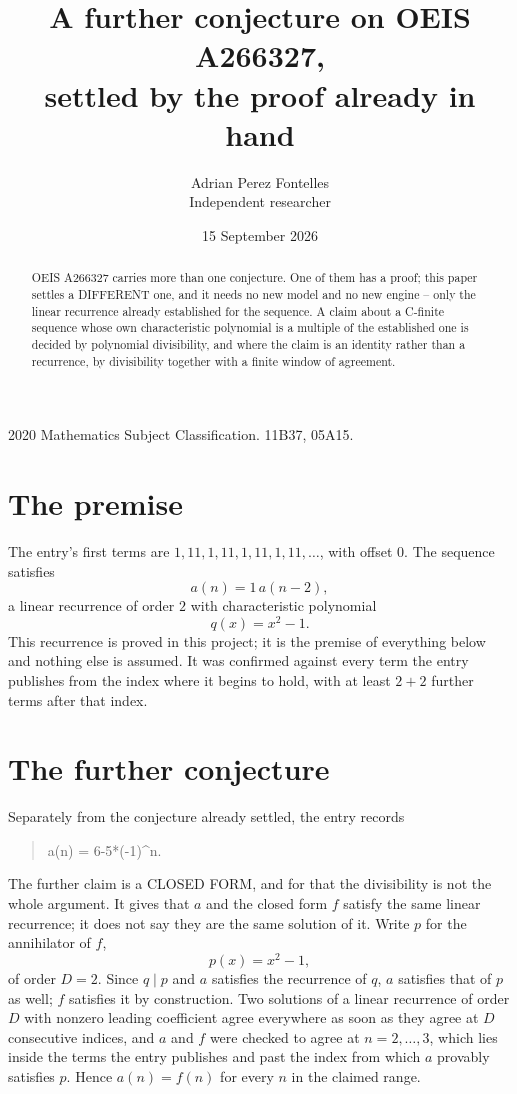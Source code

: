 \documentclass[11pt,a4paper]{article}
\title{A further conjecture on OEIS A266327,\\ \large settled by the proof already in hand}
\author{Adrian Perez Fontelles\\ \small Independent researcher}
\date{15 September 2026}
\theoremstyle{plain}
\theoremstyle{definition}
\begin{document}
\maketitle

\begin{abstract}
OEIS A266327 carries more than one conjecture. One of them has a proof; this paper settles a
DIFFERENT one, and it needs no new model and no new engine -- only the linear recurrence already
established for the sequence. A claim about a C-finite sequence whose own characteristic
polynomial is a multiple of the established one is decided by polynomial divisibility, and where
the claim is an identity rather than a recurrence, by divisibility together with a finite window
of agreement.
\end{abstract}

\noindent\small 2020 Mathematics Subject Classification. 11B37, 05A15.\normalsize

\section{The premise}

The entry's first terms are $1, 11, 1, 11, 1, 11, 1, 11,\dots$, with offset $0$. The sequence satisfies
\[
  a(n)=1\,a(n-2) ,
\]
a linear recurrence of order $2$ with characteristic polynomial
\[
  q(x)=x^{2} - 1 .
\]
This recurrence is proved in this project; it is the premise of everything below and nothing else is assumed.
It was confirmed against every term the entry publishes from the index where it begins to hold,
with at least $2+2$ further terms after that index.

\section{The further conjecture}

Separately from the conjecture already settled, the entry records

\begin{quote}\raggedright a(n) = 6-5*(-1)\^{}n.\end{quote}

The further claim is a CLOSED FORM, and for that the divisibility is not the whole argument. It
gives that $a$ and the closed form $f$ satisfy the same linear recurrence; it does not say they
are the same solution of it. Write $p$ for the annihilator of $f$,
\[
  p(x)=x^{2} - 1 ,
\]
of order $D=2$. Since $q\mid p$ and $a$ satisfies the recurrence of $q$, $a$ satisfies that of
$p$ as well; $f$ satisfies it by construction. Two solutions of a linear recurrence of order $D$
with nonzero leading coefficient agree everywhere as soon as they agree at $D$ consecutive
indices, and $a$ and $f$ were checked to agree at $n=2,\dots,3$,
which lies inside the terms the entry publishes and past the index from which $a$ provably
satisfies $p$. Hence $a(n)=f(n)$ for every $n$ in the claimed range.
\end{document}
